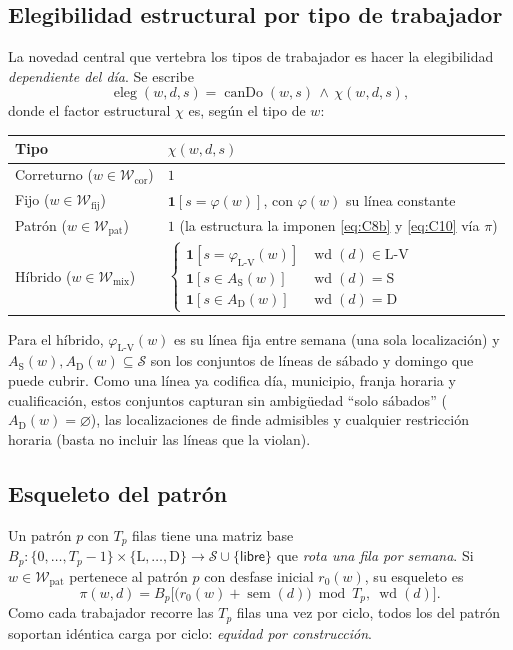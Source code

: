 \documentclass[11pt,a4paper]{article}
\newcommand{\indic}[1]{\mathbf{1}\!\left[#1\right]}
\newcommand{\eleg}{\operatorname{eleg}}
\newcommand{\canDo}{\operatorname{canDo}}
\newcommand{\wkd}{\operatorname{wd}}
\newcommand{\sem}{\operatorname{sem}}
\newcommand{\Wk}{\mathcal{W}}
\newcommand{\Sk}{\mathcal{S}}
\newcommand{\Wfij}{\Wk_{\mathrm{fij}}}
\newcommand{\Wpat}{\Wk_{\mathrm{pat}}}
\newcommand{\Wcor}{\Wk_{\mathrm{cor}}}
\newcommand{\Wmix}{\Wk_{\mathrm{mix}}}
\newcommand{\Lv}{\mathrm{L\text{-}V}}
\theoremstyle{definition}
\begin{document}
\subsection{Elegibilidad estructural por tipo de trabajador}
La novedad central que vertebra los tipos de trabajador es hacer la elegibilidad
\emph{dependiente del día}. Se escribe
\begin{equation}\label{eq:eleg}
  \eleg(w,d,s)=\canDo(w,s)\,\wedge\,\chi(w,d,s),
\end{equation}
donde el factor estructural $\chi$ es, según el tipo de $w$:
\begin{center}
\renewcommand{\arraystretch}{1.35}
\begin{tabular}{@{}ll@{}}
\toprule
Tipo & $\chi(w,d,s)$ \\
\midrule
Correturno ($w\in\Wcor$) & $1$ \\
Fijo ($w\in\Wfij$) & $\indic{s=\varphi(w)}$, con $\varphi(w)$ su línea constante \\
Patrón ($w\in\Wpat$) & $1$ \;(la estructura la imponen \eqref{eq:C8b} y \eqref{eq:C10} vía $\pi$) \\
Híbrido ($w\in\Wmix$) &
  $\begin{cases}
     \indic{s=\varphi_{\Lv}(w)} & \wkd(d)\in\Lv \\
     \indic{s\in A_{\mathrm{S}}(w)} & \wkd(d)=\mathrm{S} \\
     \indic{s\in A_{\mathrm{D}}(w)} & \wkd(d)=\mathrm{D}
   \end{cases}$ \\
\bottomrule
\end{tabular}
\end{center}
Para el híbrido, $\varphi_{\Lv}(w)$ es su línea fija entre semana (una sola localización) y
$A_{\mathrm{S}}(w),A_{\mathrm{D}}(w)\subseteq\Sk$ son los conjuntos de líneas de sábado y
domingo que puede cubrir. Como una línea ya codifica día, municipio, franja horaria y
cualificación, estos conjuntos capturan sin ambigüedad ``solo sábados''
($A_{\mathrm{D}}(w)=\varnothing$), las localizaciones de finde admisibles y cualquier
restricción horaria (basta no incluir las líneas que la violan).

\subsection{Esqueleto del patrón}
Un patrón $p$ con $T_{p}$ filas tiene una matriz base
$B_{p}:\{0,\dots,T_{p}-1\}\times\{\mathrm{L},\dots,\mathrm{D}\}\to\Sk\cup\{\textsf{libre}\}$
que \emph{rota una fila por semana}. Si $w\in\Wpat$ pertenece al patrón $p$ con desfase
inicial $r_{0}(w)$, su esqueleto es
\begin{equation}\label{eq:pi}
  \pi(w,d)=B_{p}\!\Big[\big(r_{0}(w)+\sem(d)\big)\bmod T_{p},\ \wkd(d)\Big].
\end{equation}
Como cada trabajador recorre las $T_{p}$ filas una vez por ciclo, todos los del patrón
soportan idéntica carga por ciclo: \emph{equidad por construcción}.
\end{document}
